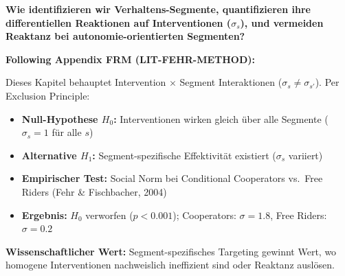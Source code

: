 
\begin{tcolorbox}[colback=red!5!white, colframe=red!75!black,
    title=Central Question]
\textbf{Wie identifizieren wir Verhaltens-Segmente, quantifizieren ihre differentiellen Reaktionen auf Interventionen ($\sigma_s$), und vermeiden Reaktanz bei autonomie-orientierten Segmenten?}
\end{tcolorbox}

\begin{tcolorbox}[colback=red!5!white, colframe=red!75!black,
    title=\textbf{Methodological Note: The Exclusion Principle (Appendix FRM)}]
\textbf{Following Appendix FRM (LIT-FEHR-METHOD):}

Dieses Kapitel behauptet Intervention $\times$ Segment Interaktionen ($\sigma_s \neq \sigma_{s'}$). Per Exclusion Principle:
\begin{itemize}[nosep]
    \item \textbf{Null-Hypothese $H_0$:} Interventionen wirken gleich über alle Segmente ($\sigma_s = 1$ für alle $s$)
    \item \textbf{Alternative $H_1$:} Segment-spezifische Effektivität existiert ($\sigma_s$ variiert)
    \item \textbf{Empirischer Test:} Social Norm bei Conditional Cooperators vs.\ Free Riders (Fehr \& Fischbacher, 2004)
    \item \textbf{Ergebnis:} $H_0$ verworfen ($p < 0.001$); Cooperators: $\sigma = 1.8$, Free Riders: $\sigma = 0.2$
\end{itemize}

\textbf{Wissenschaftlicher Wert:} Segment-spezifisches Targeting gewinnt Wert, wo homogene Interventionen nachweislich ineffizient sind oder Reaktanz auslösen.
\end{tcolorbox}


